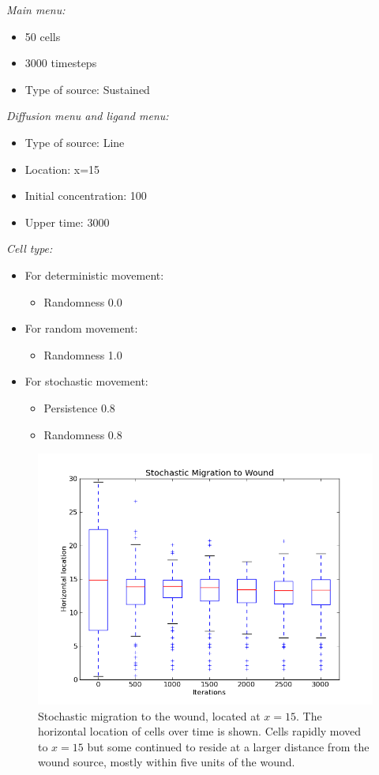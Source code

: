 \documentclass[12pt]{article}
\begin{document}
{\itshape Main menu:}
\begin{itemize}
  \item 50 cells
  \item 3000 timesteps
  \item Type of source: Sustained
\end{itemize}
{\itshape Diffusion menu and ligand menu:}
\begin{itemize}
\item Type of source: Line
\item Location: x=15
\item Initial concentration: 100
\item Upper time: 3000
\end{itemize}
{\itshape Cell type:}
\begin{itemize}
  \item For deterministic movement:
    \begin{itemize}
      \item Randomness 0.0
    \end{itemize}
  \item For random movement:
    \begin{itemize}
      \item Randomness 1.0
    \end{itemize}
  \item For stochastic movement:
    \begin{itemize}
      \item Persistence 0.8
      \item Randomness 0.8
    \end{itemize}
\end{itemize}

\begin{figure}[H]
\centering
\includegraphics[width=11.51cm]{media/StochMigrationtoWound.png}
\caption{Stochastic migration to the wound, located at \(x=15\). The horizontal location
  of cells over time is shown. Cells rapidly moved to \(x=15\) but some continued to reside
  at a larger distance from the wound source, mostly within five units of the wound.
}
\end{figure}
\end{document}
